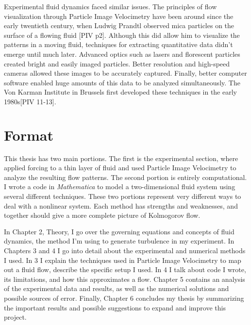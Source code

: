 	Experimental fluid dynamics faced similar issues.  The principles of flow visualization through Particle Image Velocimetry have been around since the early twentieth century, when Ludwig Prandtl observed mica particles on the surface of a flowing fluid [PIV p2].  Although this did allow him to visualize the patterns in a moving fluid, techniques for extracting quantitative data didn’t emerge until much later.  Advanced optics such as lasers and florescent particles created bright and easily imaged particles.  Better resolution and high-speed cameras allowed these images to be accurately captured.  Finally, better computer software enabled huge amounts of this data to be analyzed simultaneously.  The Von Karman Institute in Brussels first developed these techniques in the early 1980s[PIV 11-13].

\section{Format}

	This thesis has two main portions.  The first is the experimental section, where applied forcing to a thin layer of fluid and used Particle Image Velocimetry to analyze the resulting flow patterns.  The second portion is entirely computational.  I wrote a code in \textit{Mathematica} to model a two-dimensional fluid system using several different techniques.  These two portions represent very different ways to deal with a nonlinear system.  Each method has strengths and weaknesses, and together should give a more complete picture of Kolmogorov flow.

	In Chapter 2, Theory, I go over the governing equations and concepts of fluid dynamics, the method I'm using to generate turbulence in my experiment.  In Chapters 3 and 4 I go into detail about the experimental and numerical methods I used.  In 3 I explain the techniques used in Particle Image Velocimetry to map out a fluid flow, describe the specific setup I used.  In 4 I talk about code I wrote, its limitations, and how this approximates a flow.  Chapter 5 contains an analysis of the experimental data and results, as well as the numerical solutions and possible sources of error.  Finally, Chapter 6 concludes my thesis by summarizing the important results and possible suggestions to expand and improve this project.

	
